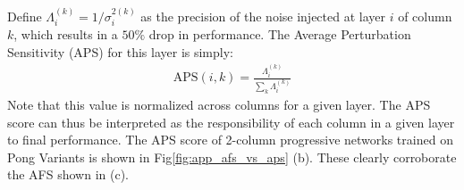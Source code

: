 Define ${\Lambda_i^{(k)}}=1/\sigma_i^{2(k)}$ as the precision of the noise
injected at layer $i$ of column $k$, which results in a $50\%$ drop in
performance. The Average Perturbation Sensitivity (APS) for this layer is
simply:
\begin{align}
    \text{APS}(i,k) = \frac{\Lambda_i^{(k)}}{\sum_k \Lambda_i^{(k)}}
\end{align}
Note that this value is normalized across columns for a given layer. The APS
score can thus be interpreted as the responsibility of each column in a given
layer to final performance.
The APS score of 2-column progressive networks trained on Pong Variants is
shown in Fig\ref{fig:app_afs_vs_aps} (b). These clearly corroborate the
AFS shown in (c).
